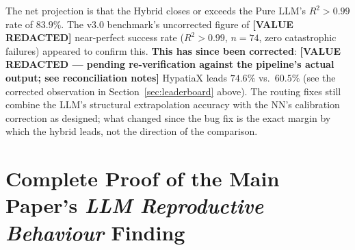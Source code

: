 \documentclass[twoside,11pt]{article}
\begin{document}
\bigskip
\noindent The net projection is that the Hybrid closes or exceeds the Pure
LLM's $R^2 > 0.99$ rate of $83.9\%$. The v3.0 benchmark's uncorrected
figure of \textbf{[VALUE REDACTED]} near-perfect success rate ($R^2>0.99$, $n=74$,
zero catastrophic failures) appeared to confirm this. \textbf{This has
since been corrected}: \textbf{[VALUE REDACTED --- pending re-verification against the pipeline's actual output; see reconciliation notes]}
HypatiaX leads $74.6\%$ vs.\ $60.5\%$ (see the corrected observation in
Section~\ref{sec:leaderboard} above). The routing fixes still combine the
LLM's structural extrapolation accuracy with the NN's calibration
correction as designed; what changed since the bug fix is the exact
margin by which the hybrid leads, not the direction of the comparison.

\appendix

\section{Complete Proof of the Main Paper's \emph{LLM Reproductive Behaviour} Finding}
\label{app:proof}
\end{document}

